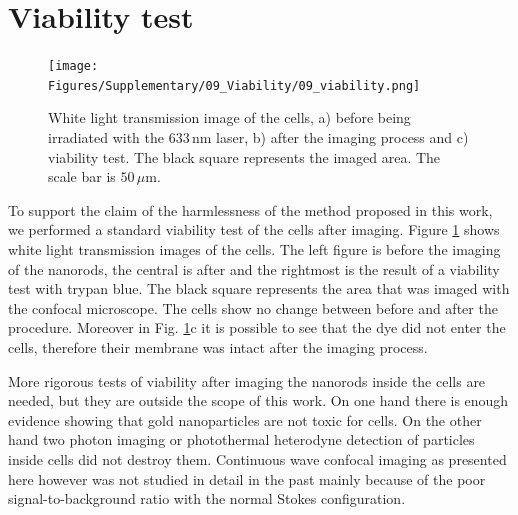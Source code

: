 \documentclass[journal=nalefd,manuscript=letter]{achemso}
\newcommand{\nm}{\ensuremath{\,\textrm{nm}}}
\newcommand{\um}{\ensuremath{\,\mu\textrm{m}}}
\begin{document}
\section{Viability test}
\begin{figure}[htp] \centering
\texttt{[image: Figures/Supplementary/09\_Viability/09\_viability.png]}
\caption{White light transmission image of the cells, a) before being
irradiated with the $633\nm$ laser, b) after the imaging process and c)
viability test. The black square represents the imaged area. The scale bar is
$50\um$.}
	\label{fig:viability}
\end{figure}

To support the claim of the harmlessness of the method proposed in this
work, we performed a standard viability test of the cells after imaging. Figure
\ref{fig:viability} shows white light transmission images of the cells. The left
figure is before the imaging of the nanorods, the central is after and the
rightmost is the result of a viability test with trypan blue. The black square
represents the area that was imaged with the confocal microscope. The cells show
no change between before and after the procedure. Moreover in Fig.
\ref{fig:viability}c it is possible to see that the dye did not enter the cells,
therefore their membrane was intact after the imaging process. 

More rigorous tests of viability after imaging the nanorods inside the cells are
needed, but they are outside the scope of this work. On one hand there is enough
evidence showing that gold nanoparticles are not toxic for
cells\cite{Huff2007,Lewinski2008}. On the other hand two photon
imaging\cite{VandenBroek2013} or photothermal heterodyne
detection\cite{Leduc2013} of particles inside cells did not destroy them.
Continuous wave confocal imaging as presented here however was not studied in
detail in the past mainly because of the poor signal-to-background ratio with
the normal Stokes configuration.


\end{document}
